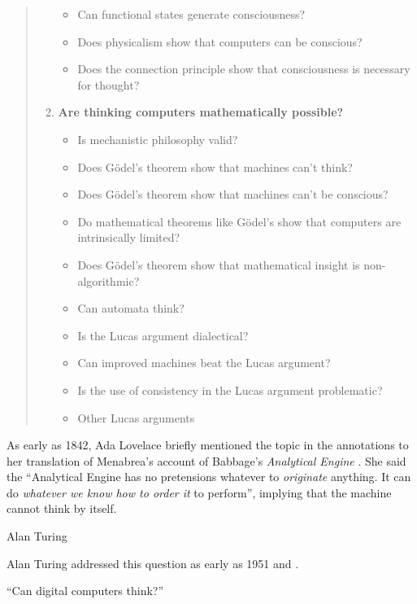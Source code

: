 \documentclass[11pt]{thesis} %
\begin{document}
\begin{quotation}
\begin{enumerate}
\begin{itemize}
        \item Can functional states generate consciousness?
        \item Does physicalism show that computers can be conscious?
        \item Does the connection principle show that consciousness is necessary for thought?
      \end{itemize}
    \item \textbf{Are thinking computers mathematically possible?}
      \begin{itemize}
        \item Is mechanistic philosophy valid?
        \item Does G{\"o}del's theorem show that machines can't think?
        \item Does G{\"o}del's theorem show that machines can't be conscious?
        \item Do mathematical theorems like G{\"o}del's show that computers are intrinsically limited?
        \item Does G{\"o}del's theorem show that mathematical insight is non-algorithmic?
        \item Can automata think?
        \item Is the Lucas argument dialectical?
        \item Can improved machines beat the Lucas argument?
        \item Is the use of consistency in the Lucas argument problematic?
        \item Other Lucas arguments
      \end{itemize}
  \end{enumerate}
\end{quotation}

As early as 1842, Ada Lovelace briefly mentioned the topic in the annotations to her translation of Menabrea's account of Babbage's \textit{Analytical Engine} \autocite{Menabrea1842}. She said the ``Analytical Engine has no pretensions whatever to \textit{originate} anything. It can do \textit{whatever we know how to order it} to perform'', implying that the machine cannot think by itself.

Alan Turing 


Alan Turing addressed this question as early as 1951 and .




\spirals

\autocite{Turing1951} ``Can digital computers think?''
\end{document}
